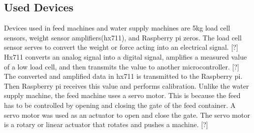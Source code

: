 \documentclass[conference]{IEEEtran}
\begin{document}
 \subsection{Used Devices}
Devices used in feed machines and water supply machines are 5kg load cell sensors, weight sensor amplifiers(hx711), and Raspberry pi zeros.
The load cell sensor serves to convert the weight or force acting into an electrical signal. [?] 
Hx711 converts an analog signal into a digital signal, amplifies a measured value of a low load cell, and then transmits the value to another microcontroller. [?]
The converted and amplified data in hx711 is transmitted to the Raspberry pi. Then Raspberry pi receives this value and performs calibration.
\hfill \break
\indent Unlike the water supply machine, the feed machine uses a servo motor. This is because the feed has to be controlled by opening and closing the gate of the feed container. A servo motor was used as an actuator to open and close the gate. The servo motor is a rotary or linear actuator that rotates and pushes a machine. [?]
\end{document}
